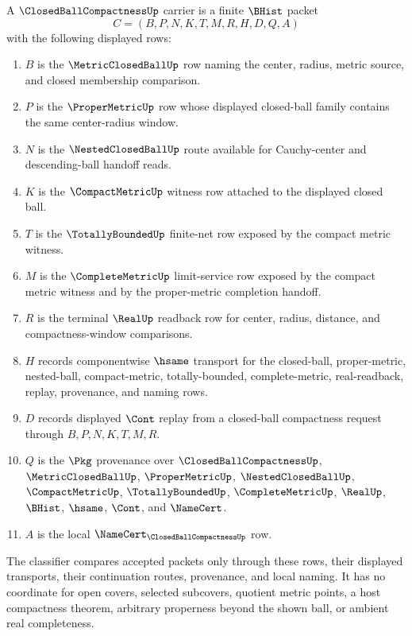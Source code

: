 \begin{definition}
\label{def:closed-ball-compactness-carrier}
A $\ClosedBallCompactnessUp$ carrier is a finite $\BHist$ packet
$$
C=(B,P,N,K,T,M,R,H,D,Q,A)
$$
with the following displayed rows:
\begin{enumerate}
\item $B$ is the $\MetricClosedBallUp$ row naming the center, radius, metric source, and closed membership comparison.
\item $P$ is the $\ProperMetricUp$ row whose displayed closed-ball family contains the same center-radius window.
\item $N$ is the $\NestedClosedBallUp$ route available for Cauchy-center and descending-ball handoff reads.
\item $K$ is the $\CompactMetricUp$ witness row attached to the displayed closed ball.
\item $T$ is the $\TotallyBoundedUp$ finite-net row exposed by the compact metric witness.
\item $M$ is the $\CompleteMetricUp$ limit-service row exposed by the compact metric witness and by the proper-metric completion handoff.
\item $R$ is the terminal $\RealUp$ readback row for center, radius, distance, and compactness-window comparisons.
\item $H$ records componentwise $\hsame$ transport for the closed-ball, proper-metric, nested-ball, compact-metric, totally-bounded, complete-metric, real-readback, replay, provenance, and naming rows.
\item $D$ records displayed $\Cont$ replay from a closed-ball compactness request through $B,P,N,K,T,M,R$.
\item $Q$ is the $\Pkg$ provenance over $\ClosedBallCompactnessUp$, $\MetricClosedBallUp$, $\ProperMetricUp$, $\NestedClosedBallUp$, $\CompactMetricUp$, $\TotallyBoundedUp$, $\CompleteMetricUp$, $\RealUp$, $\BHist$, $\hsame$, $\Cont$, and $\NameCert$.
\item $A$ is the local $\NameCert_{\ClosedBallCompactnessUp}$ row.
\end{enumerate}
The classifier compares accepted packets only through these rows, their displayed transports, their continuation routes, provenance, and local naming. It has no coordinate for open covers, selected subcovers, quotient metric points, a host compactness theorem, arbitrary properness beyond the shown ball, or ambient real completeness.
\end{definition}

